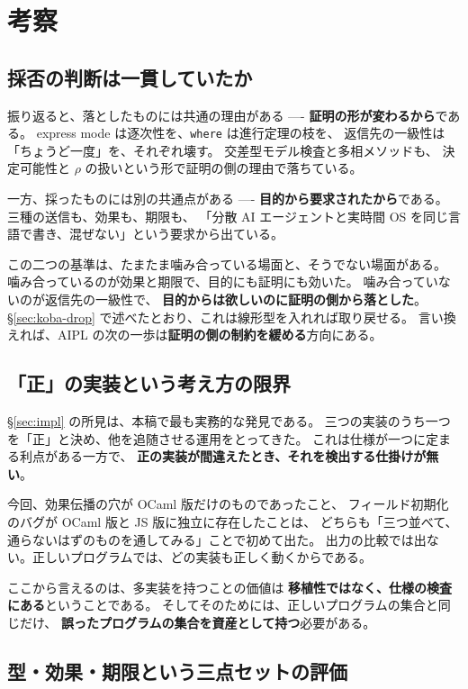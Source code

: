 \documentclass[11pt,a4paper]{ltjsarticle}
\theoremstyle{definition}
\theoremstyle{remark}
\begin{document}
\section{考察}
\label{sec:discuss}

\subsection{採否の判断は一貫していたか}

振り返ると、落としたものには共通の理由がある ----
\textbf{証明の形が変わるから}である。
express mode は逐次性を、\texttt{where} は進行定理の枝を、
返信先の一級性は「ちょうど一度」を、それぞれ壊す。
交差型モデル検査と多相メソッドも、
決定可能性と $\rho$ の扱いという形で証明の側の理由で落ちている。

一方、採ったものには別の共通点がある ----
\textbf{目的から要求されたから}である。
三種の送信も、効果も、期限も、
「分散 AI エージェントと実時間 OS を同じ言語で書き、混ぜない」という要求から出ている。

この二つの基準は、たまたま噛み合っている場面と、そうでない場面がある。
噛み合っているのが効果と期限で、目的にも証明にも効いた。
噛み合っていないのが返信先の一級性で、
\textbf{目的からは欲しいのに証明の側から落とした}。
\S\ref{sec:koba-drop} で述べたとおり、これは線形型を入れれば取り戻せる。
言い換えれば、AIPL の次の一歩は\textbf{証明の側の制約を緩める}方向にある。

\subsection{「正」の実装という考え方の限界}

\S\ref{sec:impl} の所見は、本稿で最も実務的な発見である。
三つの実装のうち一つを「正」と決め、他を追随させる運用をとってきた。
これは仕様が一つに定まる利点がある一方で、
\textbf{正の実装が間違えたとき、それを検出する仕掛けが無い}。

今回、効果伝播の穴が OCaml 版だけのものであったこと、
フィールド初期化のバグが OCaml 版と JS 版に独立に存在したことは、
どちらも「三つ並べて、通らないはずのものを通してみる」ことで初めて出た。
出力の比較では出ない。正しいプログラムでは、どの実装も正しく動くからである。

ここから言えるのは、多実装を持つことの価値は
\textbf{移植性ではなく、仕様の検査にある}ということである。
そしてそのためには、正しいプログラムの集合と同じだけ、
\textbf{誤ったプログラムの集合を資産として持つ}必要がある。

\subsection{型・効果・期限という三点セットの評価}
\end{document}
